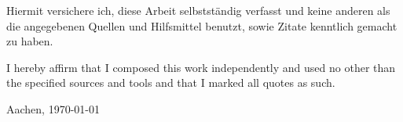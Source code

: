 \mbox{}
\vfill
Hiermit versichere ich, diese Arbeit selbstständig verfasst und keine anderen als die angegebenen Quellen und
Hilfsmittel benutzt, sowie Zitate kenntlich gemacht zu haben.
\bigskip

I hereby affirm that I composed this work independently and used no other than the specified sources and tools and
that I marked all quotes as such.
\medskip

\begin{flushright}
Aachen, \today

\vspace{1.5cm}
\small
\makeatletter\@thesisAuthor\makeatother\par
\end{flushright}
\vfill
\eject
